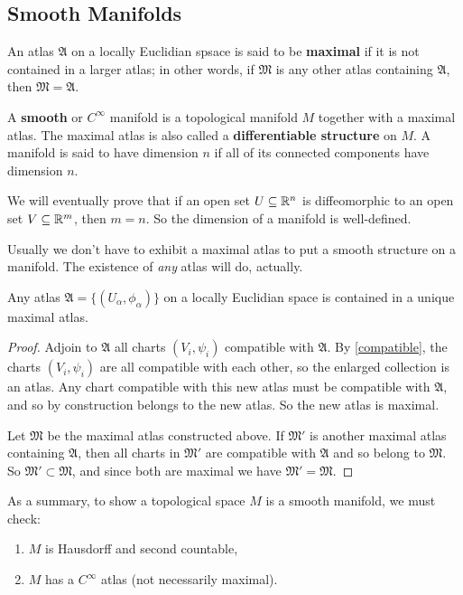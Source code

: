 \subsection{Smooth Manifolds}
An atlas $\mathfrak A$ on a locally Euclidian spsace is said to be \textbf{maximal} if it is not contained in a larger atlas; in other words, if $\mathfrak M$ is any other atlas containing $\mathfrak A$, then $\mathfrak M=\mathfrak A$.
\begin{definition}[]
    A \textbf{smooth} or $C^{\infty}$ manifold is a topological manifold $M$ together with a maximal atlas. The maximal atlas is also called a \textbf{differentiable structure} on $M$. A manifold is said to have dimension $n$ if all of its connected components have dimension $n$.
\end{definition}
We will eventually prove that if an open set $U\subseteq \mathbb{R}^n $ is diffeomorphic to an open set $V \subseteq \mathbb{R}^m$, then $m=n$. So the dimension of a manifold is well-defined.

Usually we don't have to exhibit a maximal atlas to put a smooth structure on a manifold. The existence of \emph{any} atlas will do, actually.
\begin{prop}
    Any atlas $\mathfrak A= \{(U_{\alpha }, \phi_{\alpha })\} $ on a locally Euclidian space is contained in a unique maximal atlas.
\end{prop}
\begin{proof}
    Adjoin to $\mathfrak A$ all charts $(V_i ,\psi _i )$ compatible with $\mathfrak A$. By \cref{compatible}, the charts $(V_i ,\psi _i )$ are all compatible with each other, so the enlarged collection is an atlas. Any chart compatible with this new atlas must be compatible with $\mathfrak A$, and so by construction belongs to the new atlas. So the new atlas is maximal.

    Let $\mathfrak M$ be the maximal atlas constructed above. If $\mathfrak M'$ is another maximal atlas containing $\mathfrak A$, then all charts in $\mathfrak M'$ are compatible with $\mathfrak A$ and so belong to $\mathfrak M$. So $\mathfrak M' \subset \mathfrak M$, and since both are maximal we have $\mathfrak M'=\mathfrak M$.
\end{proof}
As a summary, to show a topological space $M$ is a smooth manifold, we must check:
\begin{enumerate}[label=(\roman*)]
    \item $M$ is Hausdorff and second countable,
    \item $M$ has a $C^{\infty}$ atlas (not necessarily maximal).
\end{enumerate}

